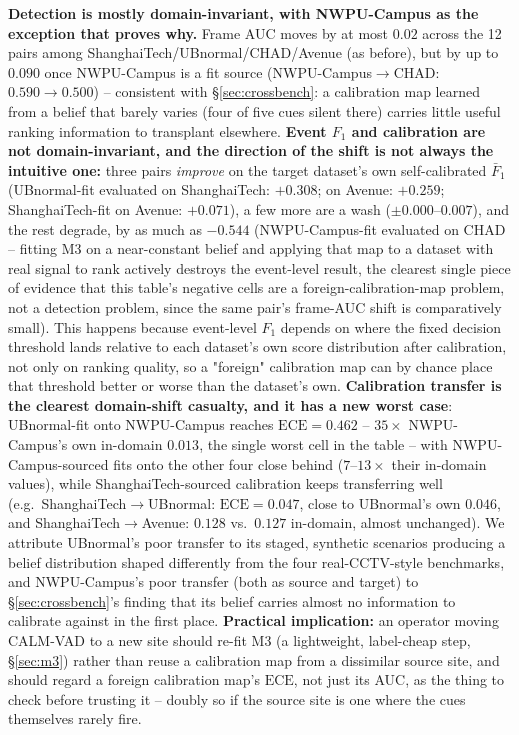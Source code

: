\documentclass[conference]{IEEEtran}
\newcommand{\ece}{\mathrm{ECE}}
\newcommand{\method}{CALM-VAD}
\begin{document}
\textbf{Detection is mostly domain-invariant, with NWPU-Campus as the
exception that proves why.} Frame AUC moves by at most $0.02$ across the 12
pairs among ShanghaiTech/UBnormal/CHAD/Avenue (as before), but by up to
$0.090$ once NWPU-Campus is a fit source (NWPU-Campus$\to$CHAD:
$0.590\to0.500$) -- consistent with \S\ref{sec:crossbench}: a calibration map
learned from a belief that barely varies (four of five cues silent there)
carries little useful ranking information to transplant elsewhere. \textbf{
Event $F_1$ and calibration are not domain-invariant, and the direction of
the shift is not always the intuitive one:} three pairs \emph{improve} on the
target dataset's own self-calibrated $\bar F_1$ (UBnormal-fit evaluated on
ShanghaiTech: $+0.308$; on Avenue: $+0.259$; ShanghaiTech-fit on Avenue:
$+0.071$), a few more are a wash ($\pm0.000$--$0.007$), and the rest degrade,
by as much as $-0.544$ (NWPU-Campus-fit evaluated on CHAD -- fitting M3 on a
near-constant belief and applying that map to a dataset with real signal to
rank actively destroys the event-level result, the clearest single piece of
evidence that this table's negative cells are a foreign-calibration-map
problem, not a detection problem, since the same pair's frame-AUC shift is
comparatively small). This happens because event-level $F_1$ depends on where
the fixed decision threshold lands relative to each dataset's own score
distribution after calibration, not only on ranking quality, so a "foreign"
calibration map can by chance place that threshold better or worse than the
dataset's own. \textbf{Calibration transfer is the clearest domain-shift
casualty, and it has a new worst case}: UBnormal-fit onto NWPU-Campus reaches
$\ece=0.462$ -- $35\times$ NWPU-Campus's own in-domain $0.013$, the single
worst cell in the table -- with NWPU-Campus-sourced fits onto the other four
close behind ($7$--$13\times$ their in-domain values), while
ShanghaiTech-sourced calibration keeps transferring well (e.g.\
ShanghaiTech$\to$UBnormal: $\ece=0.047$, close to UBnormal's own $0.046$, and
ShanghaiTech$\to$Avenue: $0.128$ vs.\ $0.127$ in-domain, almost unchanged).
We attribute UBnormal's poor transfer to its staged, synthetic scenarios
producing a belief distribution shaped differently from the four
real-CCTV-style benchmarks, and NWPU-Campus's poor transfer (both as source
and target) to \S\ref{sec:crossbench}'s finding that its belief carries
almost no information to calibrate against in the first place.
\textbf{Practical implication:} an operator moving \method{} to a new site
should re-fit M3 (a lightweight, label-cheap step, \S\ref{sec:m3}) rather than
reuse a calibration map from a dissimilar source site, and should regard a
foreign calibration map's $\ece$, not just its AUC, as the thing to check
before trusting it -- doubly so if the source site is one where the cues
themselves rarely fire.
\end{document}
